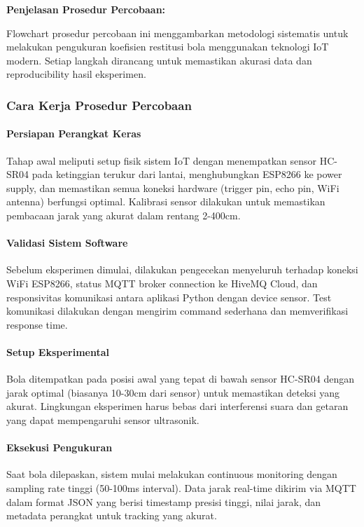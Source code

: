 \textbf{Penjelasan Prosedur Percobaan:}

Flowchart prosedur percobaan ini menggambarkan metodologi sistematis untuk melakukan pengukuran koefisien restitusi bola menggunakan teknologi IoT modern. Setiap langkah dirancang untuk memastikan akurasi data dan reproducibility hasil eksperimen.

\subsubsection{Cara Kerja Prosedur Percobaan}

\paragraph{Persiapan Perangkat Keras} Tahap awal meliputi setup fisik sistem IoT dengan menempatkan sensor HC-SR04 pada ketinggian terukur dari lantai, menghubungkan ESP8266 ke power supply, dan memastikan semua koneksi hardware (trigger pin, echo pin, WiFi antenna) berfungsi optimal. Kalibrasi sensor dilakukan untuk memastikan pembacaan jarak yang akurat dalam rentang 2-400cm.

\paragraph{Validasi Sistem Software} Sebelum eksperimen dimulai, dilakukan pengecekan menyeluruh terhadap koneksi WiFi ESP8266, status MQTT broker connection ke HiveMQ Cloud, dan responsivitas komunikasi antara aplikasi Python dengan device sensor. Test komunikasi dilakukan dengan mengirim command sederhana dan memverifikasi response time.

\paragraph{Setup Eksperimental} Bola ditempatkan pada posisi awal yang tepat di bawah sensor HC-SR04 dengan jarak optimal (biasanya 10-30cm dari sensor) untuk memastikan deteksi yang akurat. Lingkungan eksperimen harus bebas dari interferensi suara dan getaran yang dapat mempengaruhi sensor ultrasonik.

\paragraph{Eksekusi Pengukuran} Saat bola dilepaskan, sistem mulai melakukan continuous monitoring dengan sampling rate tinggi (50-100ms interval). Data jarak real-time dikirim via MQTT dalam format JSON yang berisi timestamp presisi tinggi, nilai jarak, dan metadata perangkat untuk tracking yang akurat.

